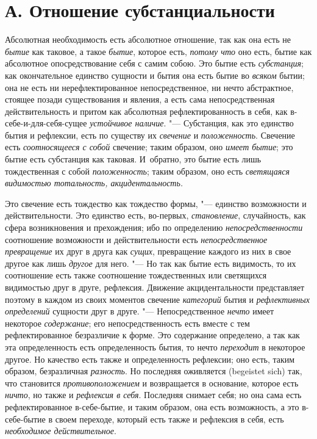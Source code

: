 \section[А. Отношение субстанциальности]{А. Отношение субстанциальности}

Абсолютная необходимость есть абсолютное
отношение, так как она есть не {\em бытие} как таковое,
а такое {\em бытие}, которое есть,
{\em потому что} оно есть, бытие как абсолютное
опосредствование себя с самим собою. Это бытие есть
{\em субстанция}; как окончательное единство сущности и
бытия она есть бытие во {\em всяком} бытии; она не есть
ни нерефлектированное непосредственное, ни нечто абстрактное, стоящее
позади существования и явления, а есть сама непосредственная
действительность и притом как абсолютная рефлектированность в себя, как
в-себе-и-для-себя-сущее {\em устойчивое наличие}. "---
Субстанция, как это единство бытия и рефлексии, есть по существу их
{\em свечение} и
{\em положенность}. Свечение есть
{\em соотносящееся с собой} свечение; таким образом,
оно {\em имеет бытие}; это бытие есть субстанция как
таковая. И~обратно, это бытие есть лишь тождественная с собой
{\em положенность}; таким образом, оно есть
{\em светящаяся видимостью тотальность,
акцидентальность.}

Это свечение есть тождество как тождество формы, "--- единство возможности и
действительности. Это единство есть, во-первых,
{\em становление}, случайность, как сфера возникновения
и прехождения; ибо по определению
{\em непосредственности} соотношение возможности и
действительности есть {\em непосредственное
превращение} их друг в друга как {\em сущих},
превращение каждого из них в свое другое как лишь
{\em другое} для него. "--- Но так как бытие есть
видимость, то их соотношение есть также соотношение тождественных или
светящихся видимостью друг в друге, рефлексия. Движение акцидентальности
представляет поэтому в каждом из своих моментов свечение
{\em категорий} бытия и
{\em рефлективных определений} сущности друг в друге. "---
Непосредственное {\em нечто} имеет некоторое
{\em содержание}; его непосредственность есть вместе с
тем рефлектированное безразличие к форме. Это содержание определено, а так
как эта определенность есть определенность бытия, то нечто
{\em переходит} в некоторое другое. Но качество есть
также и определенность рефлексии; оно есть, таким образом, безразличная
{\em разность}. Но последняя оживляется (begeistet
sich) так, что становится {\em противоположением} и
возвращается в основание, которое есть {\em ничто}, но
также и {\em рефлексия в себя}. Последняя снимает себя;
но она сама есть рефлектированное в-себе-бытие, и таким образом, она есть
возможность, а это в-себе-бытие в своем переходе, который есть также и
рефлексия в себя, есть {\em необходимое
действительное}.


